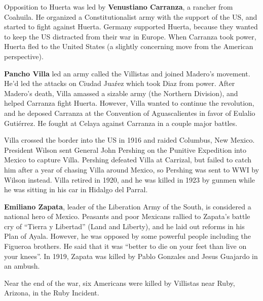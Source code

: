 Opposition to Huerta was led by \textbf{Venustiano Carranza}, a rancher from Coahuila.
He organized a Constitutionalist army with the support of the US,
and started to fight against Huerta.
Germany supported Huerta,
because they wanted to keep the US distracted from their war in Europe.
When Carranza took power, Huerta fled to the United States
(a slightly concerning move from the American perspective).

\textbf{Pancho Villa} led an army called the Villistas and joined Madero's movement.
He'd led the attacks on Ciudad Jua\'rez which took Diaz from power.
After Madero's death, Villa amassed a sizable army (the Northern Division),
and helped Carranza fight Huerta.
However, Villa wanted to continue the revolution,
and he deposed Carranza at the Convention of Aguascalientes in favor of Eulalio Guti\'errez.
He fought at Celaya against Carranza in a couple major battles.

Villa crossed the border into the US in 1916 and raided Columbus, New Mexico.
President Wilson sent General John Pershing on the Punitive Expedition into Mexico to capture Villa.
Pershing defeated Villa at Carrizal,
but failed to catch him after a year of chasing Villa around Mexico,
so Pershing was sent to WWI by Wilson instead.
Villa retired in 1920,
and he was killed in 1923 by gunmen while he was sitting in his car in Hidalgo del Parral.

\textbf{Emiliano Zapata}, leader of the Liberation Army of the South,
is considered a national hero of Mexico.
Peasants and poor Mexicans rallied to Zapata's battle cry of ``Tierra y Libertad'' (Land and Liberty),
and he laid out reforms in his Plan of Ayala.
However, he was opposed by some powerful people including the Figueroa brothers.
He said that it was ``better to die on your feet than live on your knees''.
In 1919, Zapata was killed by Pablo Gonzales and Jesus Guajardo in an ambush.

Near the end of the war, six Americans were killed by Villistas near Ruby, Arizona, in the Ruby Incident.

